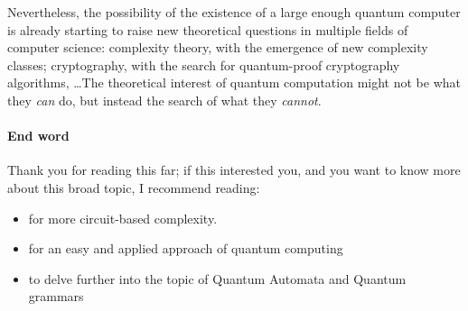 \documentclass[12pt,a4paper]{article}
\theoremstyle{plain}
\theoremstyle{definition}
\begin{document}
Nevertheless, the possibility of the existence of a large enough quantum computer is already starting to raise new theoretical questions in multiple fields of computer science: complexity theory, with the emergence of new complexity classes; cryptography, with the search for quantum-proof cryptography algorithms, \dots The theoretical interest of quantum computation might not be what they \emph{can} do, but instead the search of what they \emph{cannot}.

\paragraph*{End word}
Thank you for reading this far; if this interested you, and you want to know more about this broad topic, I recommend reading:
\begin{itemize}[label=--, noitemsep]
    \item \cite{introduction-quantum-complexity} for more circuit-based complexity.
    \item \cite{quantum-applied} for an easy and applied approach of quantum computing
    \item \cite{quantum-automata-grammars} to delve further into the topic of Quantum Automata and Quantum grammars
\end{itemize}

\nocite{*}
\printbibliography
\end{document}
